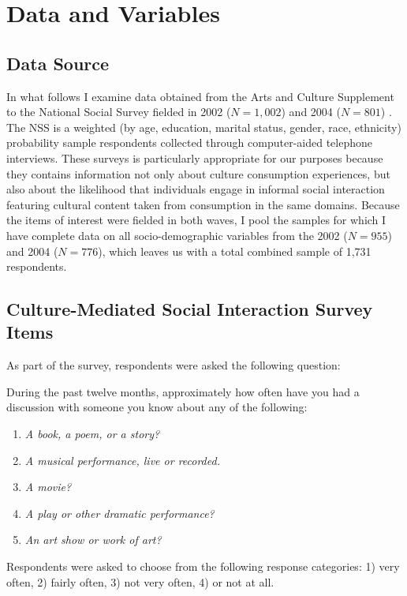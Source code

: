 \documentclass[11pt]{article}
\begin{document}
\section{Data and Variables}
\subsection{Data Source}
In what follows I examine data obtained from the Arts and Culture Supplement to the National Social Survey fielded in 2002 ($N=1,002$) and 2004 ($N=801$) \citep{NSS2002, NSS2004}.  The NSS is a weighted (by age, education, marital status, gender, race, ethnicity) probability sample respondents collected through computer-aided telephone interviews.   These surveys is particularly appropriate for our purposes because they contains information not only about culture consumption experiences, but also about the likelihood that individuals engage in informal social interaction featuring cultural content taken from consumption in the same domains.  Because the items of interest were fielded in both waves, I pool the samples for which I have complete data on all socio-demographic variables from the 2002 ($N=955$) and 2004 ($N=776$), which leaves us with a total combined sample of 1,731 respondents.

\subsection{Culture-Mediated Social Interaction Survey Items}
As part of the survey, respondents were asked the following question:

During the past twelve months, approximately how often have you had a discussion with someone you know about any of the following:
\begin{enumerate}
\item  \emph{A book, a poem, or a story?}
\item  \emph{A musical performance, live or recorded.}
\item  \emph{A movie?}
\item  \emph{A play or other dramatic performance?}
\item  \emph{An art show or work of art?}
\end{enumerate}

Respondents were asked to choose from the following response categories: 1) very often, 2) fairly often, 3) not very often, 4) or not at all. 
 
\end{document}
